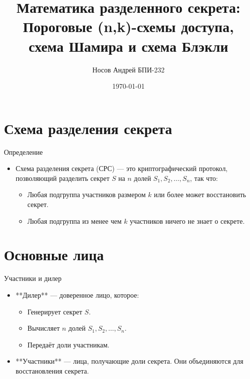 \documentclass{beamer}
\title[Математика разделенного секрета]{Математика разделенного секрета:\\ Пороговые (n,k)-схемы доступа,\\ схема Шамира и схема Блэкли}
\author[Носов Андрей]{Носов Андрей БПИ-232}
\date{\today}
\institute{}
\begin{document}
\begin{frame}
    \titlepage
\end{frame}


\section{Схема разделения секрета}
\begin{frame}{Определение}
    \begin{itemize}
        \item Схема разделения секрета (СРС) — это криптографический протокол, позволяющий разделить секрет \( S \) на \( n \) долей \( S_1, S_2, \dots, S_n \), так что:
        \begin{itemize}
            \item Любая подгруппа участников размером \( k \) или более может восстановить секрет.
            \item Любая подгруппа из менее чем \( k \) участников ничего не знает о секрете.
        \end{itemize}
    \end{itemize}
\end{frame}

\section{Основные лица}
\begin{frame}{Участники и дилер}
    \begin{itemize}
        \item **Дилер** — доверенное лицо, которое:
        \begin{itemize}
            \item Генерирует секрет \( S \).
            \item Вычисляет \( n \) долей \( S_1, S_2, \dots, S_n \).
            \item Передаёт доли участникам.
        \end{itemize}
        \item **Участники** — лица, получающие доли секрета. Они объединяются для восстановления секрета.
    \end{itemize}
\end{frame}
\end{document}

